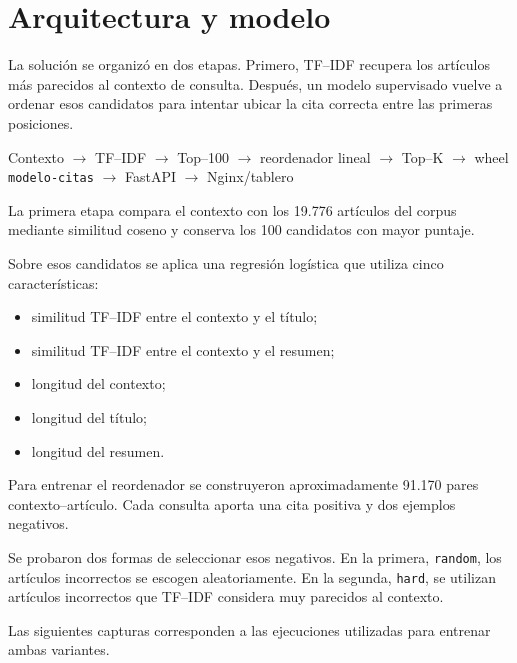 \documentclass[9pt]{article}
\begin{document}

\section{Arquitectura y modelo}

La solución se organizó en dos etapas. Primero, TF--IDF recupera los artículos
más parecidos al contexto de consulta. Después, un modelo supervisado vuelve a
ordenar esos candidatos para intentar ubicar la cita correcta entre las primeras
posiciones.

\begin{center}
\footnotesize
Contexto
$\rightarrow$
TF--IDF
$\rightarrow$
Top--100
$\rightarrow$
reordenador lineal
$\rightarrow$
Top--K
$\rightarrow$
wheel \texttt{modelo-citas}
$\rightarrow$
FastAPI
$\rightarrow$
Nginx/tablero
\end{center}

La primera etapa compara el contexto con los 19.776 artículos del corpus
mediante similitud coseno y conserva los 100 candidatos con mayor puntaje.

Sobre esos candidatos se aplica una regresión logística que utiliza cinco
características:

\begin{itemize}
    \item similitud TF--IDF entre el contexto y el título;
    \item similitud TF--IDF entre el contexto y el resumen;
    \item longitud del contexto;
    \item longitud del título;
    \item longitud del resumen.
\end{itemize}

Para entrenar el reordenador se construyeron aproximadamente 91.170 pares
contexto--artículo. Cada consulta aporta una cita positiva y dos ejemplos
negativos.

Se probaron dos formas de seleccionar esos negativos. En la primera,
\texttt{random}, los artículos incorrectos se escogen aleatoriamente. En la
segunda, \texttt{hard}, se utilizan artículos incorrectos que TF--IDF considera
muy parecidos al contexto.

Las siguientes capturas corresponden a las ejecuciones utilizadas para entrenar
ambas variantes.
\end{document}
